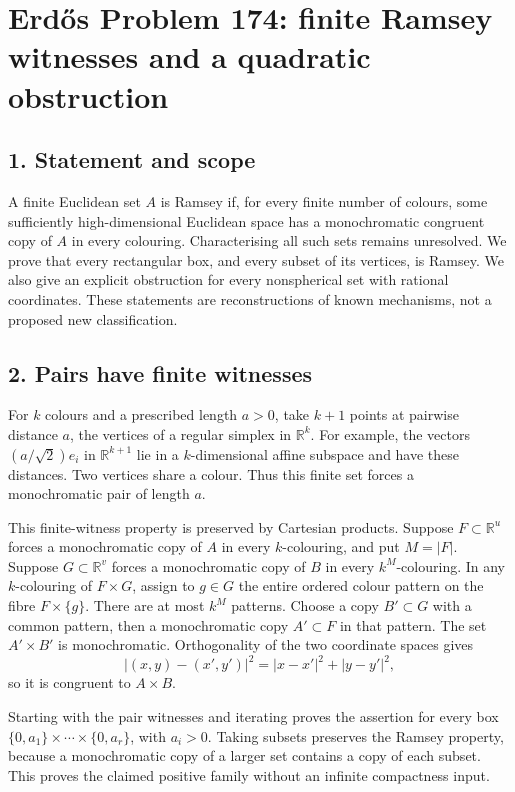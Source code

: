 \section*{Erd\H{o}s Problem 174: finite Ramsey witnesses and a quadratic obstruction}

\subsection*{1. Statement and scope}
A finite Euclidean set $A$ is Ramsey if, for every finite number of colours, some sufficiently high-dimensional Euclidean space has a monochromatic congruent copy of $A$ in every colouring. Characterising all such sets remains unresolved. We prove that every rectangular box, and every subset of its vertices, is Ramsey. We also give an explicit obstruction for every nonspherical set with rational coordinates. These statements are reconstructions of known mechanisms, not a proposed new classification.

\subsection*{2. Pairs have finite witnesses}
For $k$ colours and a prescribed length $a>0$, take $k+1$ points at pairwise distance $a$, the vertices of a regular simplex in $\mathbb R^k$. For example, the vectors $(a/\sqrt2)e_i$ in $\mathbb R^{k+1}$ lie in a $k$-dimensional affine subspace and have these distances. Two vertices share a colour. Thus this finite set forces a monochromatic pair of length $a$.

This finite-witness property is preserved by Cartesian products. Suppose $F\subset\mathbb R^u$ forces a monochromatic copy of $A$ in every $k$-colouring, and put $M=|F|$. Suppose $G\subset\mathbb R^v$ forces a monochromatic copy of $B$ in every $k^M$-colouring. In any $k$-colouring of $F\times G$, assign to $g\in G$ the entire ordered colour pattern on the fibre $F\times\{g\}$. There are at most $k^M$ patterns. Choose a copy $B'\subset G$ with a common pattern, then a monochromatic copy $A'\subset F$ in that pattern. The set $A'\times B'$ is monochromatic. Orthogonality of the two coordinate spaces gives
\[
 |(x,y)-(x',y')|^2=|x-x'|^2+|y-y'|^2,
\]
so it is congruent to $A\times B$.

Starting with the pair witnesses and iterating proves the assertion for every box
$\{0,a_1\}\times\cdots\times\{0,a_r\}$, with $a_i>0$. Taking subsets preserves the Ramsey property, because a monochromatic copy of a larger set contains a copy of each subset. This proves the claimed positive family without an infinite compactness input.

